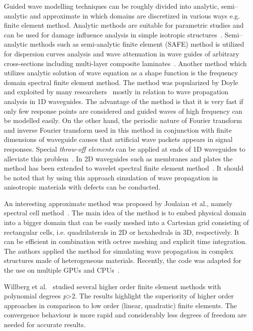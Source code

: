 \documentclass[preprint,12pt]{elsarticle}
\begin{document}
	Guided wave modelling techniques can be roughly divided into analytic, semi--analytic and approximate in which domains are discretized in various ways e.g. finite element method. Analytic methods are suitable for parametric studies and can be used for damage influence analysis in simple isotropic structures~\cite{Giurgiutiu2014}. Semi--analytic methods such as semi-analytic finite element (SAFE) method is utilized for dispersion curves analysis and wave attenuation in wave guides of arbitrary cross-sections including multi-layer composite laminates~\cite{Bartoli2006}. Another method which utilizes analytic solution of wave equation as a shape function is the frequency domain spectral finite element method. The method was popularized by Doyle~\cite{Doyle1989} and exploited by many researchers~\cite{RoyMahapatra2003,Palacz2005} mostly in relation to wave propagation analysis in 1D waveguides. The advantage of the method is that it is very fast if only few response points are considered and guided waves of high frequency can be modelled easily. On the other hand, the periodic nature of Fourier transform and inverse Fourier transform used in this method in conjunction with finite dimensions of waveguide causes that artificial wave packets appears in signal responses. Special \emph{throw-off elements} can be applied at ends of 1D waveguides to alleviate this problem~\cite{Doyle1989}. In 2D waveguides such as membranes and plates the method has been extended to wavelet spectral finite element method~\cite{Mitra2008,Yang2016}. It should be noted that by using this approach simulation of wave propagation in anisotropic materials with defects can be conducted.
	
	An interesting approximate method was proposed by Joulaian et al., namely spectral cell method~\cite{Joulaian2014}. The main idea of the method is to embed physical domain into a bigger domain 
	that can be easily meshed into a Cartesian grid consisting of rectangular cells, i.e. quadrilaterals
	in 2D or hexahedrals in 3D, respectively. It can be efficient in combination with octree meshing and explicit time integration. The authors applied the method for simulating wave propagation in complex structures made of heterogeneous materials. Recently, the code was adapted for the use on multiple GPUs and CPUs~\cite{Mossaiby2019}. 
	
	Willberg et al.~\cite{Willberg2012} studied several higher order finite element methods with polynomial degrees \emph{p}{\textgreater}2. The results highlight the superiority of higher order approaches in comparison to low order (linear, quadratic) finite elements. The convergence behaviour is more rapid and considerably less degrees of freedom are needed for accurate results.
	
\end{document}
